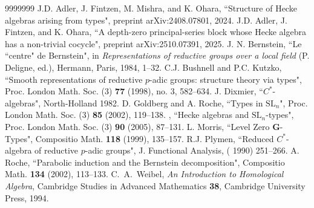 \documentclass[11pt]{amsart}
\theoremstyle{remark}
\theoremstyle{definition}
\newcommand{\SL}{\mathrm{SL}}
\begin{document}
\begin{thebibliography}{9999999}
 J.D. Adler, J. Fintzen, M. Mishra, and K. Ohara, ``Structure of Hecke algebras arising from types", preprint arXiv:2408.07801, 2024.
 J.D. Adler, J. Fintzen, and K. Ohara, ``A depth-zero principal-series block whose Hecke algebra has a non-trivial cocycle", preprint arXiv:2510.07391, 2025.
 J. N. Bernstein, ``Le ``centre" de Bernstein", in \textit{Representations of reductive groups over a local field} (P. Deligne, ed.), Hermann, Paris, 1984, 1--32. 
 C.J. Bushnell and P.C. Kutzko, ``Smooth representations of reductive $p$-adic groups: structure theory via types", Proc. London Math. Soc. (3) \textbf{77} (1998), no. 3, 582--634.
 J. Dixmier, ``$C^*$-algebras", North-Holland 1982.   
 D. Goldberg and A. Roche, ``Types in $\SL_n$", Proc. London Math. Soc. (3) \textbf{85} (2002), 119--138.
 \bysame, ``Hecke algebras and $\SL_n$-types", Proc. London Math. Soc. (3) \textbf{90} (2005), 87--131.
 L. Morris, ``Level Zero \textbf{G}-Types", Compositio Math. \textbf{118} (1999), 135--157. 
 R.J. Plymen, ``Reduced $C^*$-algebra of reductive $p$-adic groups", J. Functional Analysis,  ( 1990) 251--266.
 A. Roche, ``Parabolic induction and the Bernstein decomposition", Compositio Math. \textbf{134} (2002), 113--133. 
 C.~A.~Weibel, \emph{An Introduction to Homological Algebra}, Cambridge Studies in Advanced Mathematics \textbf{38}, Cambridge University Press, 1994.
\end{thebibliography}
\end{document}
